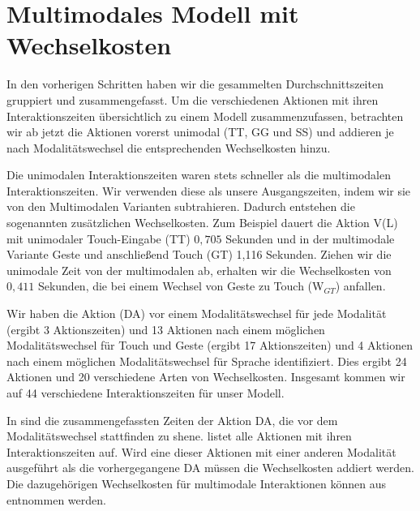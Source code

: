 \section[Multimodales Modell]{Multimodales Modell mit Wechselkosten}
In den vorherigen Schritten haben wir die gesammelten Durchschnittszeiten gruppiert und zusammengefasst.
Um die verschiedenen Aktionen mit ihren Interaktionszeiten übersichtlich zu einem Modell zusammenzufassen, betrachten wir ab jetzt die Aktionen vorerst unimodal (TT, GG und SS) und addieren je nach Modalitätswechsel die entsprechenden Wechselkosten hinzu.

Die unimodalen Interaktionszeiten waren stets schneller als die multimodalen Interaktionszeiten.
Wir verwenden diese als unsere Ausgangszeiten, indem wir sie von den Multimodalen Varianten subtrahieren.
Dadurch entstehen die sogenannten zusätzlichen Wechselkosten.
Zum Beispiel dauert die Aktion V(L) mit unimodaler Touch-Eingabe (TT) $0,705$ Sekunden und in der multimodale Variante Geste und anschließend Touch (GT) 1,116 Sekunden.
Ziehen wir die unimodale Zeit von der multimodalen ab, erhalten wir die Wechselkosten von $0,411$ Sekunden, die bei einem Wechsel von Geste zu Touch (W$_{GT}$) anfallen.

Wir haben die Aktion (DA) vor einem Modalitätswechsel für jede Modalität (ergibt 3 Aktionszeiten) und 13 Aktionen nach einem möglichen Modalitätswechsel für Touch und Geste (ergibt 17 Aktionszeiten) und 4 Aktionen nach einem möglichen Modalitätswechsel für Sprache identifiziert.
Dies ergibt 24 Aktionen und 20 verschiedene Arten von Wechselkosten.
Insgesamt kommen wir auf 44 verschiedene Interaktionszeiten für unser Modell.

In  sind die zusammengefassten Zeiten der Aktion DA, die vor dem Modalitätswechsel stattfinden zu shene.
 listet alle Aktionen mit ihren Interaktionszeiten auf.
Wird eine dieser Aktionen mit einer anderen Modalität ausgeführt als die vorhergegangene DA müssen die Wechselkosten addiert werden.
Die dazugehörigen Wechselkosten für multimodale Interaktionen können aus  entnommen werden.

